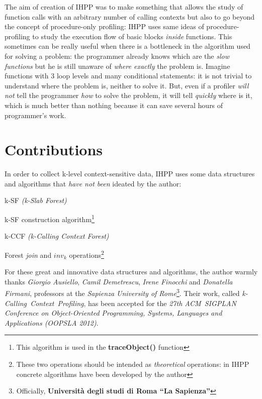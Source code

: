 \documentclass[a4paper,11pt]{report}
\begin{document}
The aim of creation of IHPP was to make something that allows the study of
function calls with an arbitrary number of calling contexts but also to go
beyond the concept of procedure-only profiling: IHPP uses same ideas of
procedure-profiling to study the execution flow of basic blocks \emph{inside}
 functions. This sometimes can be really useful when there is a bottleneck in
the algorithm used for solving a problem: the programmer already knows which are
the \emph{slow functions} but he is still unaware of \emph{where exactly}
the problem is. Imagine functions with 3 loop levels and many conditional
statements: it is not trivial to understand where the problem is, neither to
solve it. But, even if a profiler \emph{will not} tell the programmer \emph{how}
to solve the problem, it will tell \emph{quickly} where is it, which is much
better than nothing because it can save several hours of programmer's work.

\section{Contributions}

In order to collect k-level context-sensitive data, IHPP uses some data
structures and algorithms that \emph{have not been} ideated by the author:

\begin{itemize*}
\item k-SF \emph{(k-Slab Forest)}
\item k-SF construction algorithm\footnote{This algorithm is used in the \textbf{traceObject()} function}
\item k-CCF \emph{(k-Calling Context Forest)}
\item Forest \emph{join} and $inv_k$ operations\footnote{These two operations should
be intended as \emph{theoretical} operations: in IHPP concrete algorithms have been
developed by the author}
\end{itemize*}

For these great and innovative data structures and algorithms, the author warmly
thanks \emph{Giorgio Ausiello}, \emph{Camil Demetrescu}, \emph{Irene Finocchi}
and \emph{Donatella Firmani}, professors at the \emph{Sapienza University of
Rome}\footnote{Officially, \textbf{Universit\`a degli studi di Roma ``La
Sapienza''}}. Their work, called \emph{\mbox{k-Calling Context Profiling}}, has
been accepted for the \emph{27th \mbox{ACM SIGPLAN} Conference on
Object-Oriented Programming, Systems, Languages and Applications (OOPSLA 2012)}.
\end{document}
